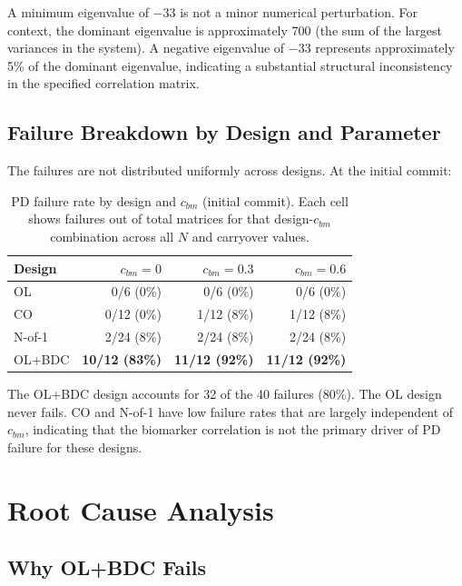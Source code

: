 \documentclass[11pt]{article}
\begin{document}
A minimum eigenvalue of $-33$ is not a minor numerical
perturbation. For context, the dominant eigenvalue is
approximately 700 (the sum of the largest variances in the
system). A negative eigenvalue of $-33$ represents approximately
5\% of the dominant eigenvalue, indicating a substantial
structural inconsistency in the specified correlation matrix.

\subsection{Failure Breakdown by Design and Parameter}

The failures are not distributed uniformly across designs. At
the initial commit:

\begin{table}[h]
\centering
\caption{PD failure rate by design and $c_{bm}$ (initial
  commit). Each cell shows failures out of total matrices for
  that design-$c_{bm}$ combination across all $N$ and
  carryover values.}
\begin{tabular}{lrrr}
\toprule
Design & $c_{bm} = 0$ & $c_{bm} = 0.3$ &
  $c_{bm} = 0.6$ \\
\midrule
OL & 0/6 (0\%) & 0/6 (0\%) & 0/6 (0\%) \\
CO & 0/12 (0\%) & 1/12 (8\%) & 1/12 (8\%) \\
N-of-1 & 2/24 (8\%) & 2/24 (8\%) & 2/24 (8\%) \\
OL+BDC & \textbf{10/12 (83\%)} & \textbf{11/12 (92\%)} &
  \textbf{11/12 (92\%)} \\
\bottomrule
\end{tabular}
\label{tab:breakdown}
\end{table}

The OL+BDC design accounts for 32 of the 40 failures (80\%).
The OL design never fails. CO and N-of-1 have low failure rates
that are largely independent of $c_{bm}$, indicating that the
biomarker correlation is not the primary driver of PD failure
for these designs.

\section{Root Cause Analysis}

\subsection{Why OL+BDC Fails}
\end{document}
